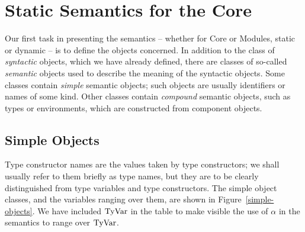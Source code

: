 %

\section{Static Semantics for the Core}
\label{statcor.sec}
Our first task in presenting the semantics -- whether for Core or Modules,
static or dynamic -- is to define the objects concerned. In addition
to the class of {\em syntactic} objects, which we have already defined,
there are classes of so-called {\em semantic} objects used to describe
the meaning of the syntactic objects. Some classes contain {\em simple}
semantic objects; such objects are usually identifiers or names of some
kind. Other classes contain {\em compound} semantic objects, such as
types or environments, which are constructed from component objects.

\subsection{Simple Objects}
Type constructor names are the values taken by type constructors; we shall
usually refer to them briefly as type names, but they are to be clearly
distinguished from type variables and type constructors.
 The simple object
classes, and the variables ranging over them, are shown in
Figure~\ref{simple-objects}. We have included ${\rm TyVar}$ in the table to
make visible the use of $\alpha$ in the semantics to range over ${\rm TyVar}$.

